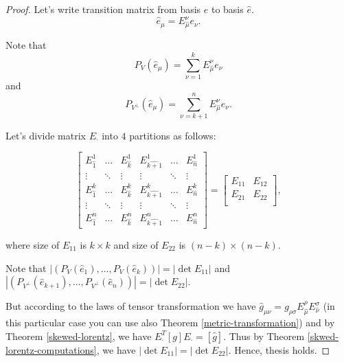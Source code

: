 \documentclass[main.tex]{subfiles}
\begin{document}
\begin{proof}
Let's write transition matrix from basis $e$ to basis $\hat{e}$. 
\begin{equation}
\hat{e}_\mu = E^\nu_{\hat{\mu}} e_\nu.
\end{equation}

Note that 
\begin{equation}
P_V(\hat{e}_\mu) = \sum_{\nu=1}^k E^\nu_{\hat{\mu}} e_\nu
\end{equation}
and
\begin{equation}
P_{V^\perp}(\hat{e}_\mu) = \sum_{\nu=k + 1}^n E^\nu_{\hat{\mu}} e_\nu.
\end{equation}

Let's divide matrix $E_{\hat{\cdot}}$ into $4$ partitions as follows:

\begin{equation}
 \begin{bmatrix}
    E^1_{\hat{1}} &  \dots & E^1_{\hat{k}} & E^1_{\hat{k + 1}} & \dots & E^1_{\hat{n}} \\
    \vdots & \ddots &\vdots & \vdots & \ddots & \vdots \\
    E^k_{\hat{1}} &  \dots & E^k_{\hat{k}} & E^k_{\hat{k + 1}} & \dots & E^k_{\hat{n}} \\
    \vdots & \ddots & \vdots & \vdots & \ddots & \vdots \\
    E^n_{\hat{1}} &  \dots & E^n_{\hat{k}} & E^n_{\hat{k + 1}} & \dots & E^n_{\hat{n}}
\end{bmatrix} = \begin{bmatrix}
    E_{11} &  E_{12} \\
    E_{21} & E_{22} \\
\end{bmatrix},
\end{equation}

where size of $E_{11}$ is $k\times k$ and size of $E_{22}$ is $(n-k)\times(n-k)$.

Note that $|(P_V(\hat{e}_1), \dots, P_V(\hat{e}_k))| = |\det E_{11}|$ and
$|(P_{V^\perp}(\hat{e}_{k+1}), \dots, P_{V^\perp}(\hat{e}_n))| = |\det E_{22}|$. 

But according to the laws of tensor transformation we have $\hat{g}_{\mu\nu} = g_{\rho\sigma} E^{\rho}_{\hat{\mu}} E^{\sigma}_{\hat{\nu}}$ (in this particular case you can use also Theorem \ref{metric-transformation}) and by Theorem \ref{skewed-lorentz}, we have $E_{\hat{\cdot}}^T [g] E_{\hat{\cdot}} = [\hat{g}]$. Thus by Theorem \ref{skwed-lorentz-computations}, we have $|\det E_{11}| = |\det E_{22}|$. Hence, thesis holds.
\end{proof}
\end{document}
